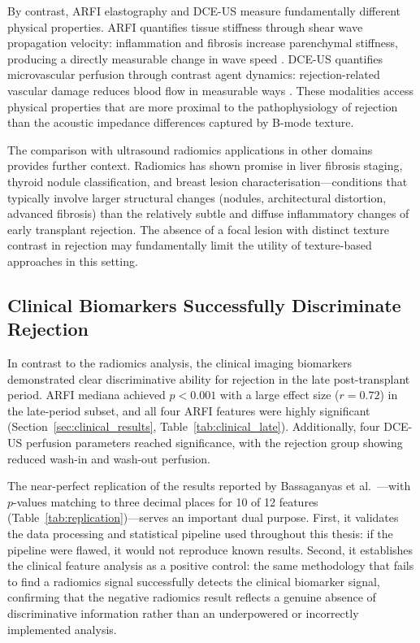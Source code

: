 By contrast, ARFI elastography and DCE-US measure fundamentally different physical properties. ARFI quantifies tissue stiffness through shear wave propagation velocity: inflammation and fibrosis increase parenchymal stiffness, producing a directly measurable change in wave speed \cite{bassaganyas2025}. DCE-US quantifies microvascular perfusion through contrast agent dynamics: rejection-related vascular damage reduces blood flow in measurable ways \cite{kersting2013}. These modalities access physical properties that are more proximal to the pathophysiology of rejection than the acoustic impedance differences captured by B-mode texture.

The comparison with ultrasound radiomics applications in other domains provides further context. Radiomics has shown promise in liver fibrosis staging, thyroid nodule classification, and breast lesion characterisation---conditions that typically involve larger structural changes (nodules, architectural distortion, advanced fibrosis) than the relatively subtle and diffuse inflammatory changes of early transplant rejection. The absence of a focal lesion with distinct texture contrast in rejection may fundamentally limit the utility of texture-based approaches in this setting.

\subsection{Clinical Biomarkers Successfully Discriminate Rejection}

In contrast to the radiomics analysis, the clinical imaging biomarkers demonstrated clear discriminative ability for rejection in the late post-transplant period. ARFI mediana achieved $p < 0.001$ with a large effect size ($r = 0.72$) in the late-period subset, and all four ARFI features were highly significant (Section~\ref{sec:clinical_results}, Table~\ref{tab:clinical_late}). Additionally, four DCE-US perfusion parameters reached significance, with the rejection group showing reduced wash-in and wash-out perfusion.

The near-perfect replication of the results reported by Bassaganyas et al.\ \cite{bassaganyas2025}---with $p$-values matching to three decimal places for 10 of 12 features (Table~\ref{tab:replication})---serves an important dual purpose. First, it validates the data processing and statistical pipeline used throughout this thesis: if the pipeline were flawed, it would not reproduce known results. Second, it establishes the clinical feature analysis as a positive control: the same methodology that fails to find a radiomics signal successfully detects the clinical biomarker signal, confirming that the negative radiomics result reflects a genuine absence of discriminative information rather than an underpowered or incorrectly implemented analysis.

